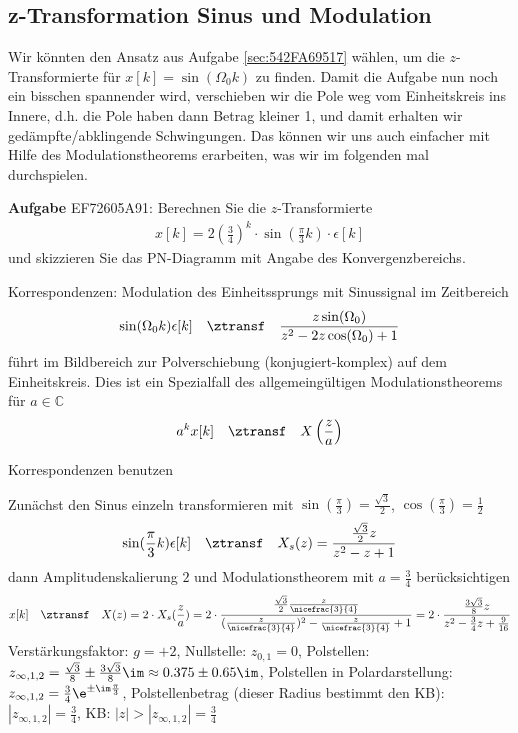 \newpage
\subsection{z-Transformation Sinus und Modulation}
\label{sec:EF72605A91}
\begin{Ziel}
Wir könnten den Ansatz aus Aufgabe \ref{sec:542FA69517} wählen, um die
$z$-Transformierte für $x[k]=\sin(\Omega_0 k)$ zu finden.
Damit die Aufgabe nun noch ein bisschen spannender wird, verschieben wir die Pole
weg vom Einheitskreis ins Innere, d.h. die Pole haben dann Betrag kleiner 1,
und damit erhalten wir gedämpfte/abklingende Schwingungen.
Das können wir uns auch einfacher mit Hilfe des Modulationstheorems erarbeiten,
was wir im folgenden mal durchspielen.
\end{Ziel}
\textbf{Aufgabe} {\tiny EF72605A91}: Berechnen Sie die $z$-Transformierte
\begin{align}
x[k] = 2 \left(\frac{3}{4}\right)^k \cdot \sin(\frac{\pi}{3} k) \cdot \epsilon[k]
\end{align}
und skizzieren Sie das PN-Diagramm mit Angabe des Konvergenzbereichs.
\begin{Werkzeug}
Korrespondenzen:
%
Modulation des Einheitssprungs mit Sinussignal im Zeitbereich
\begin{align}
\sin(\Omega_0 k)\epsilon[k]\quad\ztransf\quad\frac{z\sin(\Omega_0)}{z^2 -2 z \cos(\Omega_0)+1}
\end{align}
führt im Bildbereich zur Polverschiebung (konjugiert-komplex) auf dem Einheitskreis.
%
Dies ist ein Spezialfall des allgemeingültigen Modulationstheorems für
$a\in\mathbb{C}$
\begin{align}
a^k x[k] \quad\ztransf\quad X\left(\frac{z}{a} \right)
\end{align}
\end{Werkzeug}
\begin{Ansatz}
Korrespondenzen benutzen
\end{Ansatz}
\begin{ExCalc}
Zunächst den Sinus einzeln transformieren mit
$\sin(\frac{\pi}{3}) = \frac{\sqrt{3}}{2}$, $\cos(\frac{\pi}{3}) = \frac{1}{2}$
\begin{align}
\sin(\frac{\pi}{3} k) \epsilon[k] \quad\ztransf\quad X_s(z) = \frac{\frac{\sqrt{3}}{2}z}{z^2 - z +1}
\end{align}
dann Amplitudenskalierung $2$ und Modulationstheorem mit $a=\frac{3}{4}$ berücksichtigen
\begin{align}
x[k] \quad\ztransf\quad X(z) = 2 \cdot X_s(\frac{z}{a}) =
2 \cdot \frac{\frac{\sqrt{3}}{2} \frac{z}{\nicefrac{3}{4}}}{(\frac{z}{\nicefrac{3}{4}})^2 - \frac{z}{\nicefrac{3}{4}} +1}
=
2 \cdot \frac{\frac{3\sqrt{3}}{8} z}{z^2 - \frac{3}{4}z + \frac{9}{16}}
\end{align}
%
Verstärkungsfaktor: $g=+2$,
%
Nullstelle: $z_{0,1} = 0$,
%
Polstellen: $z_{\infty,1,2} = \frac{\sqrt{3}}{8} \pm \frac{3\sqrt{3}}{8} \im \approx 0.375 \pm 0.65\im$,
%
Polstellen in Polardarstellung: $z_{\infty,1,2} = \frac{3}{4}\e^{\pm\im \frac{\pi}{3}}$,
%
Polstellenbetrag (dieser Radius bestimmt den KB): $|z_{\infty,1,2}| = \frac{3}{4}$,
%
KB: $|z|>|z_{\infty,1,2}| = \frac{3}{4}$

\end{ExCalc}
